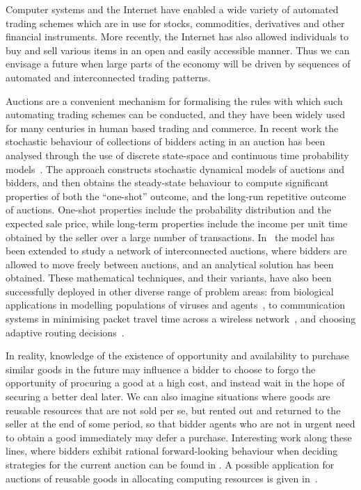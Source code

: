 \documentclass{article}
\begin{document}
Computer systems and the Internet have enabled a wide variety of
automated trading schemes which are in use for stocks,
commodities, derivatives and other financial instruments. More
recently, the Internet has also allowed individuals to buy and
sell various items in an open and easily accessible manner. Thus
we can envisage a future when large parts of the economy will be
driven by sequences of automated and interconnected trading
patterns.

Auctions are a convenient mechanism for formalising the rules with
which such automating trading schemes can be conducted, and they
have been widely used for many centuries in human based trading
and commerce. In recent work the stochastic behaviour of
collections of bidders acting in an auction has been analysed
through the use of discrete state-space and continuous time
probability models~\cite{gelenbe06}. The approach constructs
stochastic dynamical models of auctions and bidders, and then
obtains the steady-state behaviour to compute significant
properties of both the ``one-shot'' outcome, and the long-run
repetitive outcome of auctions. One-shot properties include the
probability distribution and the expected sale price, while
long-term properties include the income per unit time obtained by
the seller over a large number of transactions.
In~\cite{gelenbe_inPress} the model has been extended to study a
network of interconnected auctions, where bidders are allowed to
move freely between auctions, and an analytical solution has been
obtained. These mathematical techniques, and their variants, have
also been successfully deployed in other diverse range of problem
areas: from biological applications in modelling populations of
viruses and agents~\cite{Gelenbe-SoftwareViruses}, to
communication systems in minimising packet travel time across a
wireless network~\cite{Gelenbe07_DiffModelPacketTravel,
Gelenbe_06_Workshop_TravelDelay}, and choosing adaptive routing
decisions~\cite{Gelenbe03_Sensible}.

In reality, knowledge of the existence of opportunity and
availability to purchase similar goods in the future may influence
a bidder to choose to forgo the opportunity of procuring a good at
a high cost, and instead wait in the hope of securing a better
deal later. We can also imagine situations where goods are
reusable resources that are not sold per se, but rented out and
returned to the seller at the end of some period, so that bidder
agents who are not in urgent need to obtain a good immediately may
defer a purchase. Interesting work along these lines, where
bidders exhibit rational forward-looking behaviour when deciding
strategies for the current auction can be found in
\cite{zeithammer06}. A possible application for auctions of
reusable goods in allocating computing resources is given
in~\cite{gagliano_etal_95}.
\end{document}
